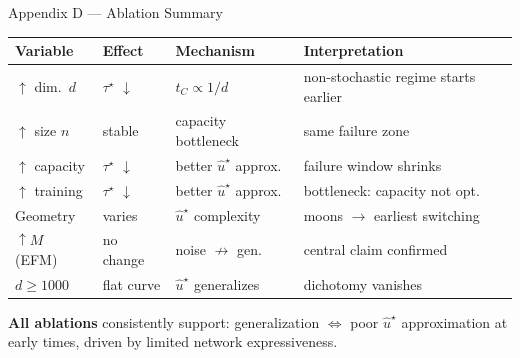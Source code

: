 \documentclass[10pt,aspectratio=169]{beamer}
\begin{document}
\begin{frame}{Appendix D --- Ablation Summary}

  \small
  \begin{center}
    \renewcommand{\arraystretch}{1.20}
    \begin{tabular}{p{2.6cm}p{1.8cm}p{2.6cm}p{4.6cm}}
      \toprule
      \textbf{Variable} & \textbf{Effect} & \textbf{Mechanism}
        & \textbf{Interpretation} \\
      \midrule
      $\uparrow$ dim.\ $d$
        & $\tau^\star$ $\downarrow$
        & $t_C\propto1/d$
        & non-stochastic regime starts earlier \\
      $\uparrow$ size $n$
        & stable
        & capacity bottleneck
        & same failure zone \\
      $\uparrow$ capacity
        & $\tau^\star$ $\downarrow$
        & better $\hat{u}^\star$ approx.
        & failure window shrinks \\
      $\uparrow$ training
        & $\tau^\star$ $\downarrow$
        & better $\hat{u}^\star$ approx.
        & bottleneck: capacity not opt. \\
      Geometry
        & varies
        & $\hat{u}^\star$ complexity
        & moons $\to$ earliest switching \\
      $\uparrow M$ (EFM)
        & no change
        & noise $\not\to$ gen.
        & central claim confirmed \\
      $d\geq1000$
        & flat curve
        & $\hat{u}^\star$ generalizes
        & dichotomy vanishes \\
      \bottomrule
    \end{tabular}
  \end{center}

  \vspace{0.3em}
  \begin{resbox}
    \small\textbf{All ablations} consistently support:
    generalization $\Leftrightarrow$ poor $\hat{u}^\star$ approximation
    at early times, driven by limited network expressiveness.
  \end{resbox}
\end{frame}
\end{document}

